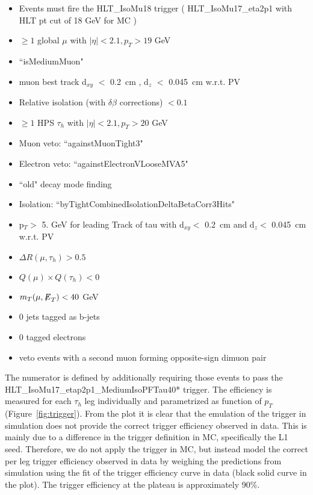\begin{itemize}
  \item Events must fire the HLT{\_}IsoMu18 trigger ( HLT{\_}IsoMu17{\_}eta2p1 with HLT pt cut of 18 GeV for MC )
  \item $\ge 1$ global $\mu$ with $|\eta| < 2.1, p_{T} > 19$ GeV
  \item ``isMediumMuon"
  \item muon best track d$_{xy}$ $<$ 0.2~cm , d$_{z}$ $<$ 0.045~cm w.r.t. PV
  \item Relative isolation (with $\delta\beta$ corrections) $< 0.1$
  \item $\ge 1$ HPS $\tau_{h}$ with $|\eta| < 2.1, p_{T} > 20$ GeV
  \item Muon veto: ``againstMuonTight3"
  \item Electron veto: ``againstElectronVLooseMVA5"
  \item ``old" decay mode finding %
  \item Isolation: ``byTightCombinedIsolationDeltaBetaCorr3Hits"
  \item p$_{T} >$ 5. GeV for leading Track of tau with d$_{xy} <$ 0.2~cm and d$_{z} <$ 0.045~cm w.r.t. PV
  \item $\Delta R(\mu,\tau_{h}) > 0.5$
  \item $Q(\mu) \times Q(\tau_{h}) < 0 $
  \item $m_{T}(\mu,{\not\mathrel{E}}_T) < 40$ GeV
  \item 0 jets tagged as b-jets
  \item 0 tagged electrons
  \item veto events with a second muon forming opposite-sign dimuon pair
\end{itemize}

The numerator is defined by additionally requiring those events to 
pass the HLT{\_}IsoMu17{\_}etap2p1{\_}MediumIsoPFTau40* trigger. 
The efficiency is measured for each $\tau_{h}$ leg individually and
parametrized as function of $p_{T}$ (Figure~\ref{fig:trigger}). From the 
plot it is clear that the emulation of the trigger in simulation does not 
provide the correct trigger efficiency observed in data. This is mainly 
due to a difference in the trigger definition in MC, specifically the 
L1 seed. Therefore, we do not apply the trigger in MC, but instead model 
the correct per leg trigger efficiency observed in data by weighing the 
predictions from simulation using the fit of the trigger efficiency 
curve in data (black solid curve in the plot). The trigger efficiency at 
the plateau is approximately 90\%. 


